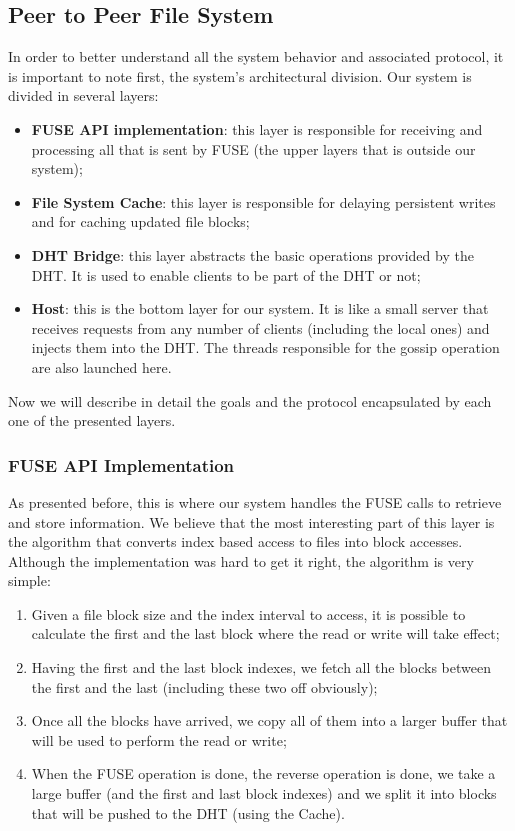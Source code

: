 \documentclass[times,9pt,article]{llncs}
\begin{document}
\subsection{Peer to Peer File System}
In order to better understand all the system behavior and associated protocol, it is important to note first, the system's architectural division. Our system is divided in several layers:

\begin{itemize}
\item \textbf{FUSE API implementation}: this layer is responsible for receiving and processing all that is sent by FUSE (the upper layers that is outside our system);
\item \textbf{File System Cache}: this layer is responsible for delaying persistent writes and for caching updated file blocks;
\item \textbf{DHT Bridge}: this layer abstracts the basic operations provided by the DHT. It is used to enable clients to be part of the DHT or not;
\item \textbf{Host}: this is the bottom layer for our system. It is like a small server that receives requests from any number of clients (including the local ones) and injects them into the DHT. The threads responsible for the gossip operation are also launched here.
\end{itemize}

Now we will describe in detail the goals and the protocol encapsulated by each one of the presented layers.

\subsubsection{FUSE API Implementation}

As presented before, this is where our system handles the FUSE calls to retrieve and store information. We believe that the most interesting part of this layer is the algorithm that converts index based access to files into block accesses. Although the implementation was hard to get it right, the algorithm is very simple:

\begin{enumerate}
\item Given a file block size and the index interval to access, it is possible to calculate the first and the last block where the read or write will take effect;
\item Having the first and the last block indexes, we fetch all the blocks between the first and the last (including these two off obviously);
\item Once all the blocks have arrived, we copy all of them into a larger buffer that will be used to perform the read or write;
\item When the FUSE operation is done, the reverse operation is done, we take a large buffer (and the first and last block indexes) and we split it into blocks that will be pushed to the DHT (using the Cache).
\end{enumerate}
\end{document}
